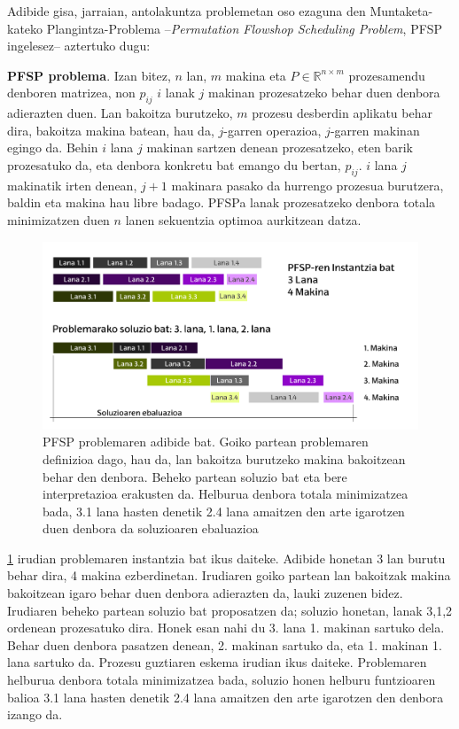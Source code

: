 \documentclass[eu]{ifirak}\usepackage[]{graphicx}\usepackage[]{color}
\begin{document}
Adibide gisa, jarraian, antolakuntza problemetan oso ezaguna den Muntaketa-kateko Plangintza-Problema --\textit{Permutation Flowshop Scheduling Problem}, PFSP ~\cite{gupta2006} ingelesez-- aztertuko dugu:

\begin{ifdefinition} {\bf PFSP problema}. Izan bitez, $n$ lan, $m$ makina eta $P\in\mathbb{R}^{n\times m}$ prozesamendu denboren matrizea, non $p_{ij}$ $i$ lanak $j$ makinan prozesatzeko behar duen denbora adierazten duen. Lan bakoitza burutzeko, $m$ prozesu desberdin aplikatu behar dira, bakoitza makina batean, hau da, $j$-garren operazioa, $j$-garren makinan egingo da. Behin $i$ lana $j$ makinan sartzen denean prozesatzeko, eten barik prozesatuko da, eta denbora konkretu bat emango du bertan, $p_{ij}$. $i$ lana $j$ makinatik irten denean, $j+1$ makinara pasako da hurrengo prozesua burutzera, baldin eta makina hau libre badago. PFSPa lanak prozesatzeko denbora totala minimizatzen duen $n$ lanen sekuentzia optimoa aurkitzean datza.
\end{ifdefinition}

\begin{figure}[t]
\centering
\includegraphics[width=0.75\linewidth]{./Irudiak/PFSP}
\caption{PFSP problemaren adibide bat. Goiko partean problemaren definizioa dago, hau da, lan bakoitza burutzeko makina bakoitzean behar den denbora. Beheko partean soluzio bat eta bere interpretazioa erakusten da. Helburua denbora totala minimizatzea bada, 3.1 lana  hasten denetik 2.4 lana amaitzen den arte igarotzen duen denbora da soluzioaren ebaluazioa}
\label{fig:pfsp}
\end{figure}

\ref{fig:pfsp} irudian problemaren instantzia bat ikus daiteke. Adibide honetan 3 lan burutu behar dira, 4 makina ezberdinetan. Irudiaren goiko partean lan bakoitzak makina bakoitzean igaro behar duen denbora adierazten da, lauki zuzenen bidez. Irudiaren beheko partean soluzio bat proposatzen da; soluzio honetan, lanak 3,1,2 ordenean prozesatuko dira. Honek esan nahi du 3. lana 1. makinan sartuko dela. Behar duen denbora pasatzen denean, 2. makinan sartuko da, eta 1. makinan 1. lana sartuko da. Prozesu guztiaren eskema irudian ikus daiteke. Problemaren helburua denbora totala minimizatzea bada, soluzio honen helburu funtzioaren balioa 3.1 lana hasten denetik 2.4 lana amaitzen den arte igarotzen den denbora izango da.
\end{document}
